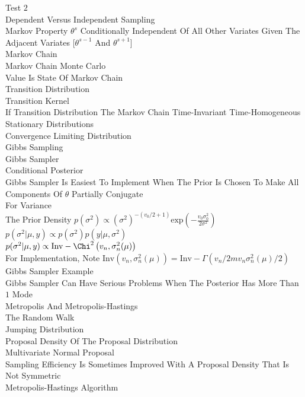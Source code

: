 \newpage
Test $2$ \\
Dependent Versus Independent Sampling \\
Markov Property $\theta^s$ Conditionally Independent Of All Other Variates Given The Adjacent Variates [$\theta^{s-1}$ And $\theta^{s+1}$] \\
Markov Chain \\
Markov Chain Monte Carlo \\
Value Is State Of Markov Chain \\
Transition Distribution \\
Transition Kernel \\
If Transition Distribution The Markov Chain Time-Invariant Time-Homogeneous \\
Stationary Distributions \\
Convergence Limiting Distribution \\
Gibbs Sampling \\
Gibbs Sampler \\
Conditional Posterior \\
Gibbs Sampler Is Easiest To Implement When The Prior Is Chosen To Make All Components Of $\theta$ Partially Conjugate \\
For Variance \\
The Prior Density $p(\sigma^2)\propto (\sigma^2)^{-(v_0/2+1)}\text{exp}\left(-\frac{v_0\sigma_0^2}{2\sigma^2} \right)$ \\
$p(\sigma^2|\mu,y)\propto p(\sigma^2)p(y|\mu,\sigma^2)$ \\
$p(\sigma^2|\mu,y)\propto \text{Inv}-\Chi^2\left(v_n,\sigma_n^2(\mu) \right)$ \\
For Implementation, Note $\text{Inv}\left(v_n,\sigma_n^2(\mu) \right)=\text{Inv}-\Gamma(v_n/2mv_n\sigma_n^2(\mu)/2)$ \\
Gibbs Sampler Example \\
Gibbs Sampler Can Have Serious Problems When The Posterior Has More Than $1$ Mode \\
Metropolis And Metropolis-Hastings \\
The Random Walk \\
Jumping Distribution \\
Proposal Density Of The Proposal Distribution \\
Multivariate Normal Proposal \\
Sampling Efficiency Is Sometimes Improved With A Proposal Density That Is Not Symmetric \\
Metropolis-Hastings Algorithm \\
